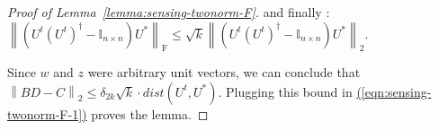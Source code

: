 \documentclass[11pt]{article}
\renewcommand{\eqref}[1]{\hyperref[#1]{(\ref*{#1})}}
\theoremstyle{plain}
\theoremstyle{definition}
\newcommand{\iprod}[2]{\langle #1, #2 \rangle}
\newcommand{\Tr}{\operatorname{Tr}}
\newcommand{\frob}[1]{\left\| {#1} \right\|_\text{F}}
\newcommand{\twonorm}[1]{\left\| {#1} \right\|_2}
\begin{document}
\begin{proof}[Proof of Lemma~\ref{lemma:sensing-twonorm-F}]
and finally : $\frob{\left(U^t(U^t)^\dag -\mathbb{I}_{n\times n}\right)U^*}\leq \sqrt{k}\twonorm{\left(U^t(U^t)^\dag -\mathbb{I}_{n\times n}\right)U^*}$. 

Since $w$ and $z$ were arbitrary unit vectors, we can conclude that $\twonorm{BD-C} \leq \delta_{2k} \sqrt{k}\cdot dist(U^t, U^*)$. 
Plugging this bound in \eqref{eqn:sensing-twonorm-F-1} proves the lemma.
\end{proof}
\end{document}

